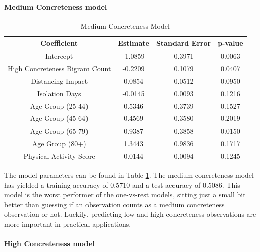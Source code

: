 \documentclass[12pt, a4paper]{article}
\begin{document}
\paragraph{Medium Concreteness model}

\begin{table}[ht]
\centering
\begin{tabular}{||c c c c||} 
 \hline
 Coefficient & Estimate & Standard Error & p-value \\ [0.5ex] 
 \hline\hline
 Intercept & -1.0859 & 0.3971 & 0.0063 \\ 
 High Concreteness Bigram Count & -0.2209 & 0.1079 & 0.0407 \\
 Distancing Impact  & 0.0854 & 0.0512 & 0.0950 \\ 
 Isolation Days & -0.0145 & 0.0093 & 0.1216 \\ 
 Age Group (25-44)  & 0.5346 & 0.3739 & 0.1527 \\ 
 Age Group (45-64)  & 0.4569 & 0.3580 & 0.2019 \\
 Age Group (65-79)  & 0.9387 & 0.3858 & 0.0150 \\
 Age Group (80+)  & 1.3443 & 0.9836 & 0.1717 \\
 Physical Activity Score  & 0.0144 & 0.0094 & 0.1245 \\ [1ex] 
 \hline
\end{tabular}
\caption{Medium Concreteness Model}
\label{table:medium}
\end{table}

The model parameters can be found in Table \ref{table:medium}. The medium concreteness model has yielded a training accuracy of 0.5710 and a test accuracy of 0.5086. This model is the worst performer of the one-vs-rest models, sitting just a small bit better than guessing if an observation counts as a medium concreteness observation or not. Luckily, predicting low and high concreteness observations are more important in practical applications. 

\paragraph{High Concreteness model}
\end{document}

